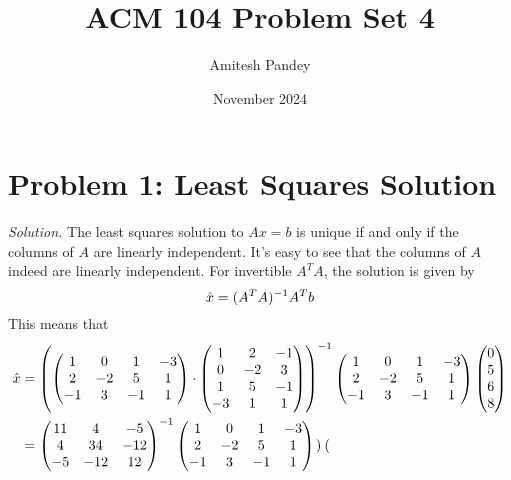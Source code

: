 \documentclass{article}
\title{ACM 104 Problem Set 4}
\author{Amitesh Pandey}
\date{November 2024}
\begin{document}
\maketitle
\section*{Problem 1: Least Squares Solution}
\emph{Solution. }The least squares solution to $Ax = b$ is unique if and only if the columns of $A$ are linearly independent. It's easy to see that the columns of $A$ indeed are linearly independent. For invertible $A^{T}A$, the solution is given by
\begin{equation*}
    \Hat{x} = (A^{T}A)^{-1}A^{T}b
\end{equation*}
This means that 
\begin{align*}
    \Hat{x} &= \left(\begin{pmatrix}
        1 & 0 & 1 & -3\\
        2 & -2 & 5 & 1\\
        -1 & 3 & -1& 1
    \end{pmatrix} \cdot \begin{pmatrix}
        1 & 2 & -1\\
        0 & -2 & 3\\
        1 & 5 & -1\\
        -3 & 1 & 1
    \end{pmatrix}\right)^{-1}\begin{pmatrix}
        1 & 0 & 1 & -3\\
        2 & -2 & 5 & 1\\
        -1 & 3 & -1& 1
    \end{pmatrix}\begin{pmatrix}
        0\\
        5\\
        6\\
        8
    \end{pmatrix}\\
    &= \begin{pmatrix}
        11 & 4 & -5\\
        4 & 34 & -12\\
        -5 & -12 & 12
    \end{pmatrix}^{-1}\begin{pmatrix}
        1 & 0 & 1 & -3\\
        2 & -2 & 5 & 1\\
        -1 & 3 & -1& 1
    \end{pmatrix}\cdot\begin{pmatrix}

\end{pmatrix}
\end{align*}
\end{document}
